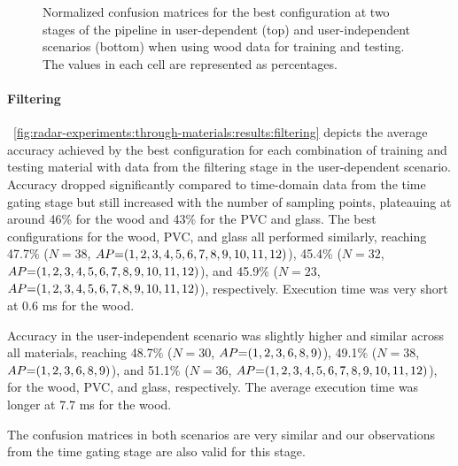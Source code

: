 \begin{figure}[!b]
    \vspace{-6pt}
    \caption{Normalized confusion matrices for the best configuration at two stages of the pipeline in user-dependent (top) and user-independent scenarios (bottom) when using wood data for training and testing. The values in each cell are represented as percentages.}
    \label{fig:radar-experiments:through-materials:wood-confusion}
\end{figure}

\paragraph{Filtering}
\fig~\ref{fig:radar-experiments:through-materials:results:filtering} depicts the average accuracy achieved by the best configuration for each combination of training and testing material with data from the filtering stage in the user-dependent scenario.
%
Accuracy dropped significantly compared to time-domain data from the time gating stage but still increased with the number of sampling points, plateauing at around 46\% for the wood and 43\% for the PVC and glass.
The best configurations for the wood, PVC, and glass all performed similarly, reaching 47.7\% ($N{=}38$, $\splitatcommas{AP{=}(1, 2, 3, 4, 5, 6, 7, 8, 9, 10, 11, 12)}$), 45.4\% ($N{=}32$, $\splitatcommas{AP{=}(1, 2, 3, 4, 5, 6, 7, 8, 9, 10, 11, 12)}$), and 45.9\% ($N{=}23$, $\splitatcommas{AP{=}(1, 2, 3, 4, 5, 6, 7, 8, 9, 10, 11, 12)}$), respectively. Execution time was very short at 0.6 ms for the wood.

Accuracy in the user-independent scenario was slightly higher and similar across all materials, reaching 48.7\% ($N{=}30$, $\splitatcommas{AP{=}(1, 2, 3, 6, 8, 9)}$), 49.1\% ($N{=}38$, $\splitatcommas{AP{=}(1, 2, 3, 6, 8, 9)}$), and 51.1\% ($N{=}36$, $\splitatcommas{AP{=}(1, 2, 3, 4, 5, 6, 7, 8, 9, 10, 11, 12)}$), for the wood, PVC, and glass, respectively. The average execution time was longer at 7.7 ms for the wood.

The confusion matrices in both scenarios are very similar and our observations from the time gating stage are also valid for this stage. 





